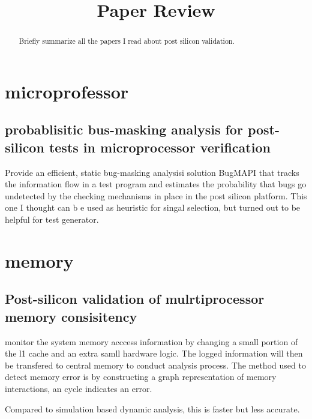 \documentclass[conference]{IEEEtran}
\begin{document}
\title{Paper Review}

\author{
}
\maketitle


\begin{abstract}
Briefly summarize all the papers I read about post silicon validation.
\end{abstract}

\section{microprofessor}
\subsection{probablisitic bus-masking analysis for post-silicon tests in microprocessor verification}
Provide an efficient, static bug-masking analysisi solution BugMAPI that tracks the information flow in a 
test program and estimates the probability that bugs go undetected by the checking mechanisms in place
in the post silicon platform.
This one I thought can b e used as heuristic for singal selection, but turned out to be helpful for test generator.
\section{memory}
\subsection{Post-silicon validation of mulrtiprocessor memory consisitency~\cite{mammo2015post}}
monitor the system memory acccess information by changing a small portion of the l1 cache and an extra samll hardware logic.
The logged information will then be transfered to central memory to conduct analysis process.
The method used to detect memory error is by constructing a graph representation of memory interactions, an cycle indicates an error.

Compared to simulation based dynamic analysis, this is faster but less accurate.
\end{document}
